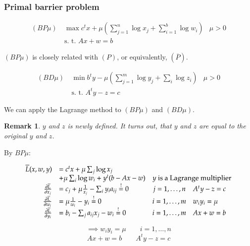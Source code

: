 \documentclass[a4paper]{article}
\numberwithin{lecref}{subsection}
\newtheorem*{Remark}{Remark}
\begin{document}
\subsubsection{Primal barrier problem}

\begin{align*}
	(BP\mu) \: &\max c^t x + \mu \left(\sum_{j=1}^n \log x_j + \sum_{i=1}^b \log w_i\right) & \mu > 0 \\
    &\text{s. t. } Ax + w = b
\end{align*}

$(BP\mu)$ is closely related with $(P)$, or equivalently, $(\overline P)$.

\begin{align*}
	(BD\mu) \: &\min b^t y - \mu \left(\sum_{j=1}^m \log y_j + \sum_i \log z_i\right) & \mu > 0 \\
	&\text{s. t. } A^t y - z = c
\end{align*}

We can apply the Lagrange method to $(BP\mu)$ and $(BD\mu)$.

\begin{Remark}
	$y$ and $z$ is newly defined. It turns out, that $y$ and $z$ are equal to the original $y$ and $z$.
\end{Remark}

By $BP\mu$:

\[
	\begin{array}{rlcl}
		\overline L(x, w, y) &= c^t x + \mu \sum_j \log x_j & & \\
			&+ \mu \sum_i \log w_i + y^t (b - Ax - w) & \multicolumn{2}{c}{y \text{ is a Lagrange multiplier}} \\
		\frac{\partial \overline L}{\partial x_j} &= c_j + \mu \frac{1}{x_j} - \sum_i y_i a_{ij} \overset!= 0 & j = 1, \dots, n & A^t y - z = c \\
		\frac{\partial \overline L}{\partial w_i} &= \mu \frac{1}{w_i} - y_i \overset!= 0 & i = 1, \dots, m & w_i y_i = \mu \\
		\frac{\partial \overline L}{\partial y_i} &= b_i - \sum_j a_{ij} x_j - w_i \overset!= 0 & i = 1, \dots, m & Ax + w = b
	\end{array}
\]

\[ \implies w_i y_i = \mu \qquad i = 1, \dots, n \]
\[ Ax + w = b \qquad A^t y - z = c \]
\end{document}
